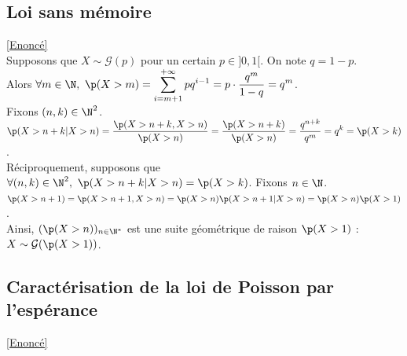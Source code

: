 \documentclass[8pt]{book}
\begin{document}
	\subsection{Loi sans mémoire }
	\label{Loi sans mémoire corrigé}
		\textcolor{blue}{\hyperref[Loi sans mémoire]{[Enoncé]}}\\
	Supposons que $X\sim \mathcal{G}(p)$ pour un certain $p\in ]0,1[$. On note $q=1-p$.\\ Alors $\forall m\in \N,\ \p(X>m)=\displaystyle\sum\limits_{i=m+1}^{+\infty}pq^{i-1}=p\cdot\frac{q^m}{1-q}=q^m$.\\
	Fixons $(n,k)\in \N^2$.\\
	$\p(X>n+k|X>n)=\displaystyle\frac{\p(X>n+k,X>n)}{\p(X>n)}=\frac{\p(X>n+k)}{\p(X>n)}=\frac{q^{n+k}}{q^m}=q^k=\p(X>k)$.\\
	Réciproquement, supposons que $\forall (n,k)\in\N^2, \ \p(X>n+k|X>n)=\p(X>k)$. Fixons $n\in \N$.\\
	$\p(X>n+1)=\p(X>n+1,X>n)=\p(X>n)\p(X>n+1|X>n)=\p(X>n)\p(X>1)$.\\
	Ainsi, $(\p(X>n))_{n\in \N^*}$ est une suite géométrique de raison $\p(X>1)$ : $X\sim \mathcal{G}(\p(X>1))$.
	
	\subsection{Caractérisation de la loi de Poisson par l'espérance}
	\label{Caractérisation de la loi de Poisson par l'espérance corrigé}
	\textcolor{blue}{\hyperref[Caractérisation de la loi de Poisson par l'espérance]{[Enoncé]}}\\
	
\end{document}
